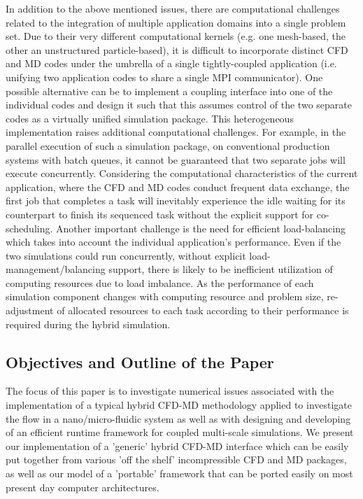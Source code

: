 \documentclass[preprint,12pt]{elsarticle}
\begin{document}
In addition to the above mentioned issues, there are computational challenges related to the integration of multiple application domains into a single problem set. Due to their very different computational kernels (e.g. one mesh-based, the other an unstructured particle-based), it is difficult to incorporate distinct CFD and MD codes under the umbrella of a single tightly-coupled application (i.e. unifying two application codes to share a single MPI communicator). One possible alternative can be to implement a coupling interface into one of the individual codes and design it such that this assumes control of the two separate codes as a virtually unified simulation package. This heterogeneous implementation raises additional computational challenges. For example, in the parallel execution of such a simulation package, on conventional production systems with batch queues, it cannot be guaranteed that two separate jobs will execute concurrently. Considering the computational characteristics of the current application, where the CFD and MD codes conduct frequent data exchange, the first job that completes a task will inevitably experience the idle waiting for its counterpart to finish its sequenced task without the explicit support for co-scheduling. Another important challenge is the need for efficient load-balancing which takes into account the individual application's performance. Even if the two simulations could run concurrently, without explicit load-management/balancing support, there is likely to be inefficient utilization of computing resources due to load imbalance. As the performance of each simulation component changes with computing resource and problem size, re-adjustment of allocated resources to each task according to their performance is required during the hybrid simulation.



\subsection{Objectives and Outline of the Paper}
\label{sec:intro_contents}

The focus of this paper is to investigate numerical issues associated with the implementation of a typical hybrid CFD-MD methodology applied to investigate the flow in a nano/micro-fluidic system as well as with designing and developing of an efficient runtime framework for coupled multi-scale simulations. We present our implementation of a 'generic' hybrid CFD-MD interface which can be easily put together from various 'off the shelf' incompressible CFD and MD packages, as well as our model of a 'portable' framework that can be ported easily on most present day computer architectures. 
\end{document}
